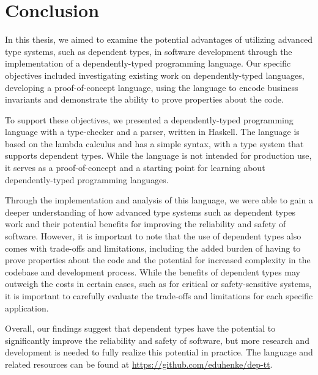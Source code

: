 \documentclass[12pt]{article}
\theoremstyle{definition}
\begin{document}
\section{Conclusion}

In this thesis, we aimed to examine the potential advantages of utilizing advanced type systems, such as dependent types, in software development through the implementation of a dependently-typed programming language. Our specific objectives included investigating existing work on dependently-typed languages, developing a proof-of-concept language, using the language to encode business invariants and demonstrate the ability to prove properties about the code.

To support these objectives, we presented a dependently-typed programming language with a type-checker and a parser, written in Haskell. The language is based on the lambda calculus and has a simple syntax, with a type system that supports dependent types. While the language is not intended for production use, it serves as a proof-of-concept and a starting point for learning about dependently-typed programming languages.

Through the implementation and analysis of this language, we were able to gain a deeper understanding of how advanced type systems such as dependent types work and their potential benefits for improving the reliability and safety of software. However, it is important to note that the use of dependent types also comes with trade-offs and limitations, including the added burden of having to prove properties about the code and the potential for increased complexity in the codebase and development process. While the benefits of dependent types may outweigh the costs in certain cases, such as for critical or safety-sensitive systems, it is important to carefully evaluate the trade-offs and limitations for each specific application.

Overall, our findings suggest that dependent types have the potential to significantly improve the reliability and safety of software, but more research and development is needed to fully realize this potential in practice. The language and related resources can be found at \url{https://github.com/eduhenke/dep-tt}.



\end{document}

